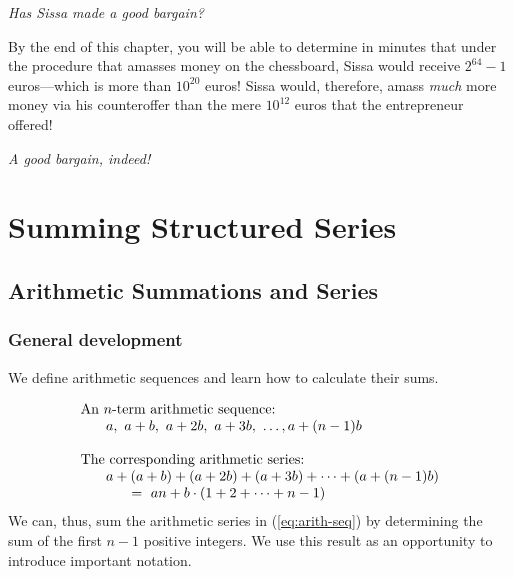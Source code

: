 \smallskip

\noindent
{\em Has Sissa made a good bargain?}

\smallskip

\noindent
By the end of this chapter, you will be able to determine in minutes
that under the procedure that amasses money on the chessboard, Sissa  
would receive $2^{64} -1$ euros---which is more than $10^{20}$ euros!  Sissa would, therefore, amass
{\em much} more money via his counteroffer than the mere $10^{12}$ euros that the entrepreneur
offered!

\noindent
{\em A good bargain, indeed!}



\section{Summing Structured Series}
\label{sec:structured-series}

\subsection{Arithmetic Summations and Series}
\label{sec:arithmetic-series}

\subsubsection{General development}

We define arithmetic sequences and learn how to calculate their sums.

\begin{equation}
\label{eq:arith-seq}
\begin{array}{l}
\mbox{An $n$-term arithmetic sequence:} \\
\hspace*{.25in}a, \ a+b, \ a+2b, \ a+3b, \ \ldots, a+(n-1)b \\
\\
\mbox{The corresponding arithmetic series:} \\
\hspace*{.25in}a + (a+b) + (a+2b) + (a+3b) + \cdots + (a+(n-1)b) \\
\hspace*{.5in} = \
an + b \cdot (1 + 2 + \cdots + n-1)
\end{array}
\end{equation}
We can, thus, sum the arithmetic series in (\ref{eq:arith-seq}) by
determining the sum of the first $n-1$ positive integers.  We use this
result as an opportunity to introduce important notation.

